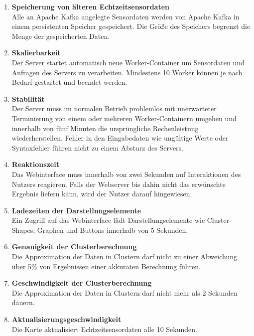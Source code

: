 \begin{enumerate}[label=\textbf{NF\arabic{enumi}0}]
	\item \textbf{Speicherung von älteren Echtzeitsensordaten}\\
	Alle an Apache Kafka angelegte Sensordaten werden von Apache Kafka in einem persistenten Speicher gespeichert. Die Größe des Speichers begrenzt die Menge der gespeicherten Daten.
	
	\item \textbf{Skalierbarkeit}\\
	Der Server startet automatisch neue Worker-Container um Sensordaten und Anfragen des Servers zu verarbeiten. Mindestens 10 Worker können je nach Bedarf gestartet und beendet werden.
	
	\item \textbf{Stabilität}\\  
	Der Server muss im normalen Betrieb problemlos mit unerwarteter Terminierung von einem oder mehreren Worker-Containern umgehen und innerhalb von fünf Minuten die ursprüngliche Rechenleistung wiederherstellen. Fehler in den Eingabedaten wie ungültige Werte oder Syntaxfehler führen nicht zu einem Absturz des Servers.
	
	\item \textbf{Reaktionszeit}\\
	Das Webinterface muss innerhalb von zwei Sekunden auf Interaktionen des Nutzers reagieren. Falls der Webserver bis dahin nicht das erwünschte Ergebnis liefern kann, wird der Nutzer darauf hingewiesen.
	
	\item \textbf{Ladezeiten der Darstellungselemente}\\
	Ein Zugriff auf das Webinterface lädt Darstellungselemente wie Cluster-Shapes, Graphen und Buttons innerhalb von 5 Sekunden.
	
	\item \textbf{Genauigkeit der Clusterberechnung}\\
	Die Approximation der Daten in Clustern darf nicht zu einer Abweichung über 5\% von Ergebnissen einer akkuraten Berechnung führen.
	
	\item \textbf{Geschwindigkeit der Clusterberechnung}\\
	Die Approximation der Daten in Clustern darf nicht mehr als 2 Sekunden dauern.
	
	\item \textbf{Aktualisierungsgeschwindigkeit}\\
	Die Karte aktualisiert Echtzeitsensordaten alle 10 Sekunden.

\end{enumerate}
	
